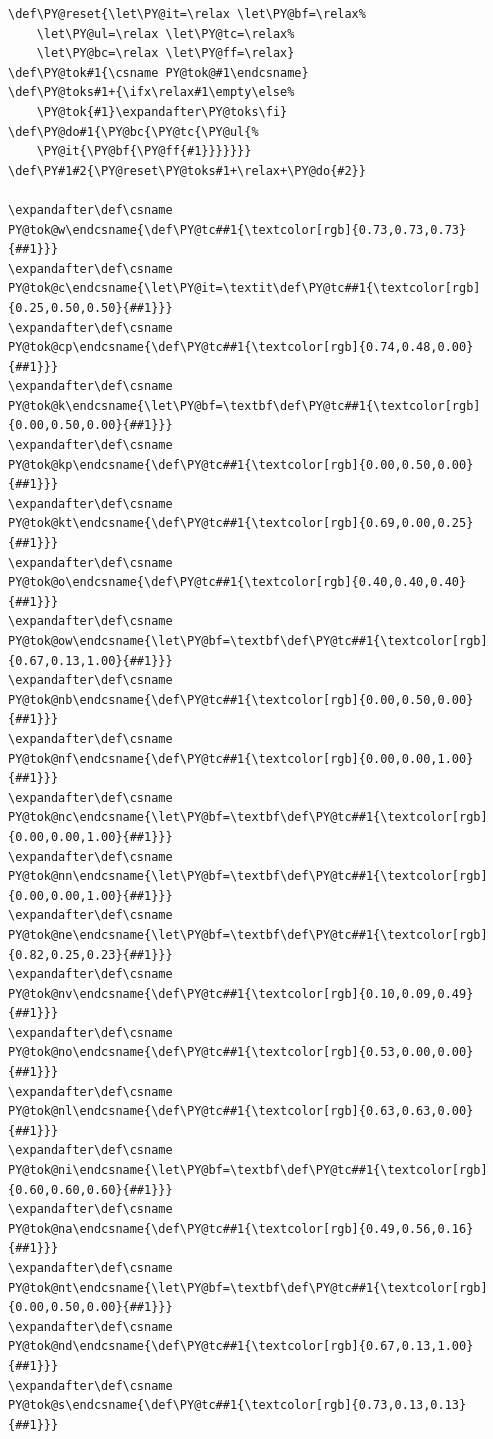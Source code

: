 \documentclass[a4paper]{article}
\begin{document}
\begin{lstlisting}
\def\PY@reset{\let\PY@it=\relax \let\PY@bf=\relax%
    \let\PY@ul=\relax \let\PY@tc=\relax%
    \let\PY@bc=\relax \let\PY@ff=\relax}
\def\PY@tok#1{\csname PY@tok@#1\endcsname}
\def\PY@toks#1+{\ifx\relax#1\empty\else%
    \PY@tok{#1}\expandafter\PY@toks\fi}
\def\PY@do#1{\PY@bc{\PY@tc{\PY@ul{%
    \PY@it{\PY@bf{\PY@ff{#1}}}}}}}
\def\PY#1#2{\PY@reset\PY@toks#1+\relax+\PY@do{#2}}

\expandafter\def\csname PY@tok@w\endcsname{\def\PY@tc##1{\textcolor[rgb]{0.73,0.73,0.73}{##1}}}
\expandafter\def\csname PY@tok@c\endcsname{\let\PY@it=\textit\def\PY@tc##1{\textcolor[rgb]{0.25,0.50,0.50}{##1}}}
\expandafter\def\csname PY@tok@cp\endcsname{\def\PY@tc##1{\textcolor[rgb]{0.74,0.48,0.00}{##1}}}
\expandafter\def\csname PY@tok@k\endcsname{\let\PY@bf=\textbf\def\PY@tc##1{\textcolor[rgb]{0.00,0.50,0.00}{##1}}}
\expandafter\def\csname PY@tok@kp\endcsname{\def\PY@tc##1{\textcolor[rgb]{0.00,0.50,0.00}{##1}}}
\expandafter\def\csname PY@tok@kt\endcsname{\def\PY@tc##1{\textcolor[rgb]{0.69,0.00,0.25}{##1}}}
\expandafter\def\csname PY@tok@o\endcsname{\def\PY@tc##1{\textcolor[rgb]{0.40,0.40,0.40}{##1}}}
\expandafter\def\csname PY@tok@ow\endcsname{\let\PY@bf=\textbf\def\PY@tc##1{\textcolor[rgb]{0.67,0.13,1.00}{##1}}}
\expandafter\def\csname PY@tok@nb\endcsname{\def\PY@tc##1{\textcolor[rgb]{0.00,0.50,0.00}{##1}}}
\expandafter\def\csname PY@tok@nf\endcsname{\def\PY@tc##1{\textcolor[rgb]{0.00,0.00,1.00}{##1}}}
\expandafter\def\csname PY@tok@nc\endcsname{\let\PY@bf=\textbf\def\PY@tc##1{\textcolor[rgb]{0.00,0.00,1.00}{##1}}}
\expandafter\def\csname PY@tok@nn\endcsname{\let\PY@bf=\textbf\def\PY@tc##1{\textcolor[rgb]{0.00,0.00,1.00}{##1}}}
\expandafter\def\csname PY@tok@ne\endcsname{\let\PY@bf=\textbf\def\PY@tc##1{\textcolor[rgb]{0.82,0.25,0.23}{##1}}}
\expandafter\def\csname PY@tok@nv\endcsname{\def\PY@tc##1{\textcolor[rgb]{0.10,0.09,0.49}{##1}}}
\expandafter\def\csname PY@tok@no\endcsname{\def\PY@tc##1{\textcolor[rgb]{0.53,0.00,0.00}{##1}}}
\expandafter\def\csname PY@tok@nl\endcsname{\def\PY@tc##1{\textcolor[rgb]{0.63,0.63,0.00}{##1}}}
\expandafter\def\csname PY@tok@ni\endcsname{\let\PY@bf=\textbf\def\PY@tc##1{\textcolor[rgb]{0.60,0.60,0.60}{##1}}}
\expandafter\def\csname PY@tok@na\endcsname{\def\PY@tc##1{\textcolor[rgb]{0.49,0.56,0.16}{##1}}}
\expandafter\def\csname PY@tok@nt\endcsname{\let\PY@bf=\textbf\def\PY@tc##1{\textcolor[rgb]{0.00,0.50,0.00}{##1}}}
\expandafter\def\csname PY@tok@nd\endcsname{\def\PY@tc##1{\textcolor[rgb]{0.67,0.13,1.00}{##1}}}
\expandafter\def\csname PY@tok@s\endcsname{\def\PY@tc##1{\textcolor[rgb]{0.73,0.13,0.13}{##1}}}

\end{lstlisting}
\end{document}
